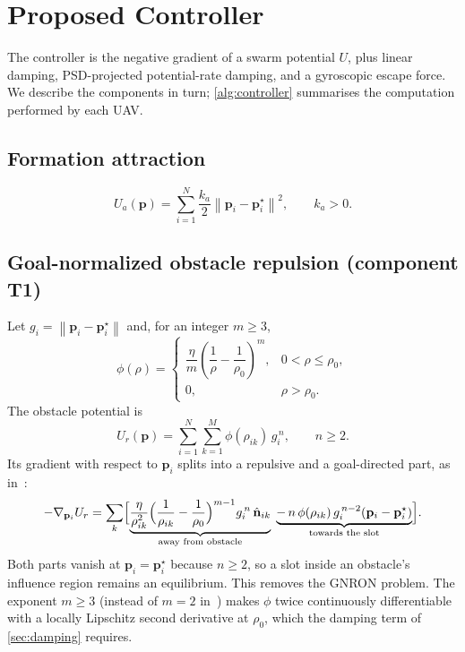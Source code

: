 \documentclass[11pt]{article}
\theoremstyle{definition}
\theoremstyle{remark}
\newcommand{\bp}{\mathbf{p}}
\newcommand{\bn}{\hat{\mathbf{n}}}
\newcommand{\norm}[1]{\left\lVert #1 \right\rVert}
\begin{document}
\section{Proposed Controller}\label{sec:method}

The controller is the negative gradient of a swarm potential $U$, plus linear
damping, PSD-projected potential-rate damping, and a gyroscopic escape force.
We describe the components in turn; \cref{alg:controller} summarises the
computation performed by each UAV.

\subsection{Formation attraction}
\begin{equation}\label{eq:Ua}
  U_a(\bp)=\sum_{i=1}^{N}\frac{k_a}{2}\norm{\bp_i-\bp_i^\star}^2,\qquad k_a>0.
\end{equation}

\subsection{Goal-normalized obstacle repulsion (component T1)}\label{sec:repulsion}
Let $g_i=\norm{\bp_i-\bp_i^\star}$ and, for an integer $m\ge3$,
\begin{equation}\label{eq:phi}
  \phi(\rho)=\begin{cases}\dfrac{\eta}{m}\left(\dfrac{1}{\rho}-\dfrac{1}{\rho_0}\right)^{m}, & 0<\rho\le\rho_0,\\[1ex] 0, & \rho>\rho_0.\end{cases}
\end{equation}
The obstacle potential is
\begin{equation}\label{eq:Ur}
  U_r(\bp)=\sum_{i=1}^{N}\sum_{k=1}^{M}\phi(\rho_{ik})\,g_i^{\,n},\qquad n\ge2 .
\end{equation}
Its gradient with respect to $\bp_i$ splits into a repulsive and a
goal-directed part, as in~\cite{ge2000}:
\begin{equation}\label{eq:Ur_grad}
  -\nabla_{\bp_i}U_r=\sum_{k}\Bigl[\underbrace{\frac{\eta}{\rho_{ik}^2}\Bigl(\frac{1}{\rho_{ik}}-\frac{1}{\rho_0}\Bigr)^{m-1}g_i^{\,n}\,\bn_{ik}}_{\text{away from obstacle}}\;\underbrace{-\,n\,\phi(\rho_{ik})\,g_i^{\,n-2}(\bp_i-\bp_i^\star)}_{\text{towards the slot}}\Bigr].
\end{equation}
Both parts vanish at $\bp_i=\bp_i^\star$ because $n\ge2$, so a slot inside an
obstacle's influence region remains an equilibrium. This removes the GNRON
problem. The exponent $m\ge3$ (instead of $m=2$ in~\cite{khatib1986,ge2000})
makes $\phi$ twice continuously differentiable with a locally Lipschitz second
derivative at $\rho_0$, which the damping term of \cref{sec:damping} requires.
\end{document}
